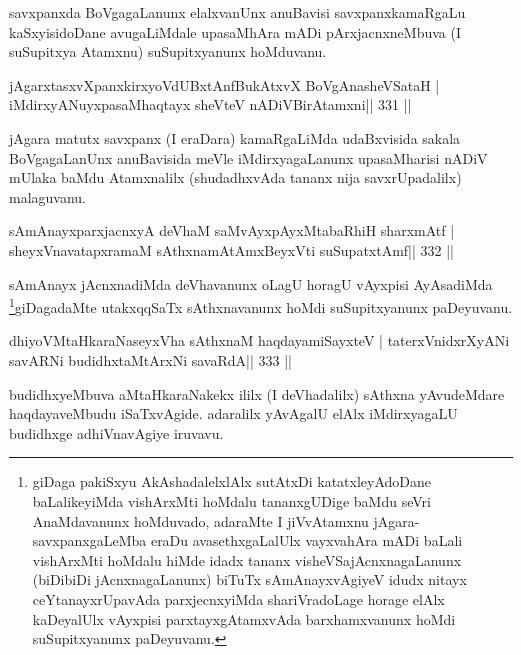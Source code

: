 \begin{artha}
savxpanxda BoVgagaLanunx elalxvanUnx anuBavisi savxpanxkamaRgaLu  kaSxyisidoDane avugaLiMdale upasaMhAra mADi pArxjacnxneMbuva (I suSupitxya Atamxnu) suSupitxyanunx hoMduvanu.
\end{artha}


\begin{shl}
jAgarxtasxvXpanxkirxyoVdUBxtAnfBukAtxvX BoVgAnasheVSataH |
iMdirxyANuyxpasaMhaqtayx sheVteV nADiVBirAtamxni\hfill || 331 ||
\end{shl}

\begin{artha}
jAgara matutx savxpanx (I eraDara) kamaRgaLiMda udaBxvisida sakala BoVgagaLanUnx anuBavisida meVle iMdirxyagaLanunx upasaMharisi nADiV mUlaka baMdu Atamxnalilx (shudadhxvAda tananx nija savxrUpadalilx) malaguvanu.
\end{artha}

\begin{shl}
sAmAnayxparxjacnxyA deVhaM saMvAyxpAyxMtabaRhiH sharxmAtf |
sheyxVnavatapxramaM sAthxnamAtAmx\s BeyxVti suSupatxtAmf\hfill || 332 ||
\end{shl}

\begin{artha}
sAmAnayx jAcnxnadiMda deVhavanunx oLagU horagU vAyxpisi AyAsadiMda 
\footnote{giDaga pakiSxyu AkAshadalelxlAlx sutAtxDi katatxleyAdoDane 
baLalikeyiMda vishArxMti hoMdalu tananxgUDige baMdu seVri AnaMdavanunx 
hoMduvado, adaraMte I jiVvAtamxnu jAgara-savxpanxgaLeMba eraDu avasethxgaLalUlx vayxvahAra mADi baLali vishArxMti hoMdalu hiMde idadx tananx visheVSajAcnxnagaLanunx (biDibiDi jAcnxnagaLanunx) biTuTx sAmAnayxvAgiyeV idudx nitayx ceYtanayxrUpavAda parxjecnxyiMda shariVradoLage horage elAlx kaDeyalUlx vAyxpisi parxtayxgAtamxvAda barxhamxvanunx hoMdi suSupitxyanunx paDeyuvanu.}giDagadaMte utakxqqSaTx sAthxnavanunx hoMdi suSupitxyanunx paDeyuvanu.
\end{artha}

\begin{shl}
dhiyoV\s MtaHkaraNaseyxVha sAthxnaM haqdayamiSayxteV |
taterxVnidxrXyANi savARNi budidhxtaMtArxNi savaRdA\hfill || 333 ||
\end{shl}

\begin{artha}
budidhxyeMbuva aMtaHkaraNakekx ililx (I deVhadalilx) sAthxna  yAvudeMdare haqdayaveMbudu iSaTxvAgide. adaralilx yAvAgalU elAlx iMdirxyagaLU budidhxge adhiVnavAgiye iruvavu.
\end{artha}

